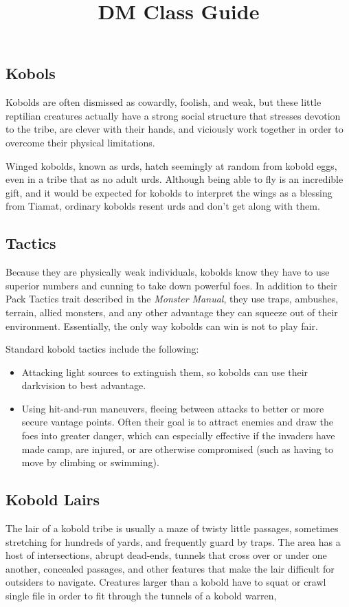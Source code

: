 \documentclass{dm}
\title{DM Class Guide}
\begin{document}
  \begin{cols}

    \killsectionspace{}
    \section{Kobols}
    Kobolds are often dismissed as cowardly, foolish, and weak, but these little reptilian creatures actually have a strong social structure that stresses devotion to the tribe, are clever with their hands, and viciously work together in order to overcome their physical limitations.

    \begin{content}[Urds]
      Winged kobolds, known as urds, hatch seemingly at random from kobold eggs, even in a tribe that as no adult urds.
      Although being able to fly is an incredible gift, and it would be expected for kobolds to interpret the wings as a blessing from Tiamat, ordinary kobolds resent urds and don't get along with them.
    \end{content}

    \subsection{Tactics}
    Because they are physically weak individuals, kobolds know they have to use superior numbers and cunning to take down powerful foes.
    In addition to their Pack Tactics trait described in the \textit{Monster Manual}, they use traps, ambushes, terrain, allied monsters, and any other advantage they can squeeze out of their environment.
    Essentially, the only way kobolds can win is not to play fair.

    Standard kobold tactics include the following:
    \begin{itemize}
      \item Attacking light sources to extinguish them, so kobolds can use their darkvision to best advantage.
      \item Using hit-and-run maneuvers, fleeing between attacks to better or more secure vantage points.
            Often their goal is to attract enemies and draw the foes into greater danger, which can especially effective if the invaders have made camp, are injured, or are otherwise compromised (such as having to move by climbing or swimming).
    \end{itemize}

    \subsection{Kobold Lairs}
    The lair of a kobold tribe is usually a maze of twisty little passages, sometimes stretching for hundreds of yards, and frequently guard by traps.
    The area has a host of intersections, abrupt dead-ends, tunnels that cross over or under one another, concealed passages, and other features that make the lair difficult for outsiders to navigate.
    Creatures larger than a kobold have to squat or crawl single file in order to fit through the tunnels of a kobold warren, 


\end{cols}
\end{document}
